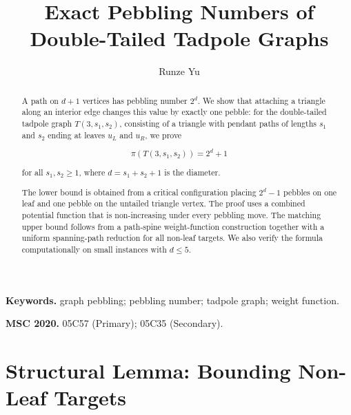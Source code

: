 \documentclass[11pt]{article}
\title{Exact Pebbling Numbers of Double-Tailed Tadpole Graphs}
\author{Runze Yu}
\date{}
\begin{document}
\maketitle


\begin{abstract}

A path on $d+1$ vertices has pebbling number $2^d$.
We show that attaching a triangle along an interior edge changes this value
by exactly one pebble:
for the double-tailed tadpole graph $T(3,s_1,s_2)$, consisting of a triangle
with pendant paths of lengths $s_1$ and $s_2$ ending at leaves $u_L$ and
$u_R$, we prove

\[
\pi(T(3,s_1,s_2))=2^d+1
\]

for all $s_1,s_2\ge1$, where $d=s_1+s_2+1$ is the diameter.

The lower bound is obtained from a critical configuration placing
$2^d-1$ pebbles on one leaf and one pebble on the untailed triangle vertex.
The proof uses a combined potential function that is non-increasing under
every pebbling move. The matching upper bound follows from a path-spine
weight-function construction together with a uniform spanning-path reduction
for all non-leaf targets. We also verify the formula computationally on
small instances with $d\le5$.

\end{abstract}


\medskip


\noindent
\textbf{Keywords.}
graph pebbling; pebbling number; tadpole graph; weight function.


\medskip


\noindent
\textbf{MSC 2020.}
05C57 (Primary); 05C35 (Secondary).













\section{Structural Lemma: Bounding Non-Leaf Targets}
\label{sec:lemmas}







\end{document}
